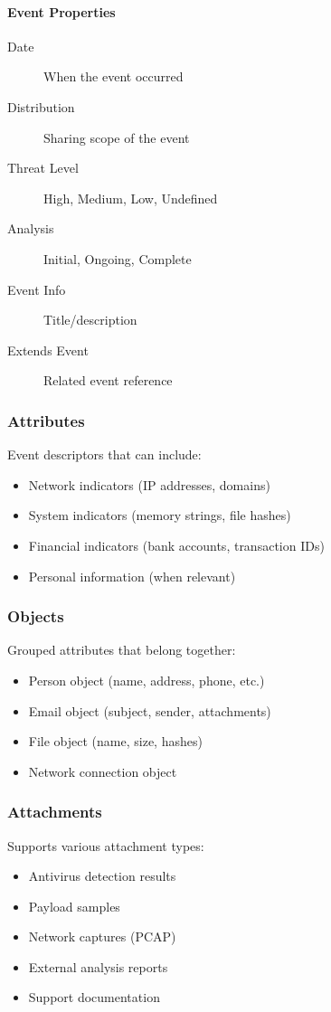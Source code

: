 \paragraph{Event Properties}
\begin{description}
    \item[Date] When the event occurred
    \item[Distribution] Sharing scope of the event
    \item[Threat Level] High, Medium, Low, Undefined
    \item[Analysis] Initial, Ongoing, Complete
    \item[Event Info] Title/description
    \item[Extends Event] Related event reference
\end{description}

\subsubsection{Attributes}
Event descriptors that can include:
\begin{itemize}
    \item Network indicators (IP addresses, domains)
    \item System indicators (memory strings, file hashes)
    \item Financial indicators (bank accounts, transaction IDs)
    \item Personal information (when relevant)
\end{itemize}

\subsubsection{Objects}
Grouped attributes that belong together:
\begin{itemize}
    \item Person object (name, address, phone, etc.)
    \item Email object (subject, sender, attachments)
    \item File object (name, size, hashes)
    \item Network connection object
\end{itemize}

\subsubsection{Attachments}
Supports various attachment types:
\begin{itemize}
    \item Antivirus detection results
    \item Payload samples
    \item Network captures (PCAP)
    \item External analysis reports
    \item Support documentation
\end{itemize}

